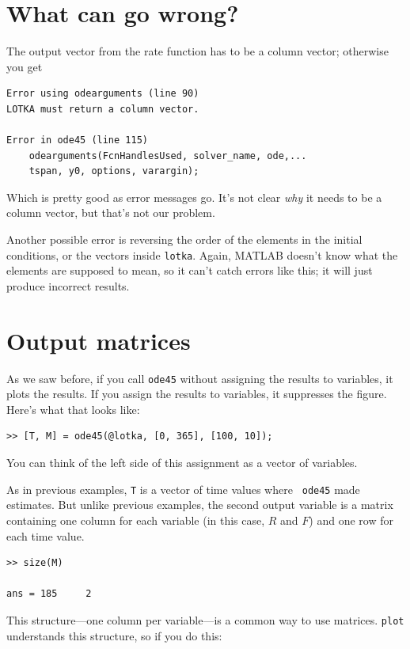 \documentclass{book}
\begin{document}
\section{What can go wrong?}

The output vector from the rate function
has to be a column vector; otherwise you get

\begin{verbatim}
Error using odearguments (line 90)
LOTKA must return a column vector.

Error in ode45 (line 115)
    odearguments(FcnHandlesUsed, solver_name, ode,...
    tspan, y0, options, varargin);
\end{verbatim}

Which is pretty good as error messages go.  It's not clear {\em why}
it needs to be a column vector, but that's not our problem.

Another possible error is reversing the order of the elements in the
initial conditions, or the vectors inside {\tt lotka}.  Again, MATLAB
doesn't know what the elements are supposed to mean, so it can't catch
errors like this; it will just produce incorrect results.


\section{Output matrices}

As we saw before, if you call {\tt ode45} without assigning the
results to variables, it plots the results.  
If you assign
the results to variables, it suppresses the figure.
Here's what that looks like:

\begin{verbatim}
>> [T, M] = ode45(@lotka, [0, 365], [100, 10]);
\end{verbatim}

You can think of the left side of this assignment as a vector
of variables.

As in previous examples, {\tt T} is a vector of time values where {\tt
ode45} made estimates.  But unlike previous examples, the
second output variable is a matrix containing one column for each
variable (in this case, $R$ and $F$) and one row for each time value.

\begin{verbatim}
>> size(M)

ans = 185     2
\end{verbatim}

This structure---one column per variable---is a common way to
use matrices.  {\tt plot} understands this structure, so if you
do this:
\end{document}

